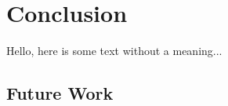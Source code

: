 \documentclass[../main.tex]{subfiles}
\begin{document}
\section{Conclusion}
Hello, here is some text without a meaning...

\subsection{Future Work}
\end{document}

